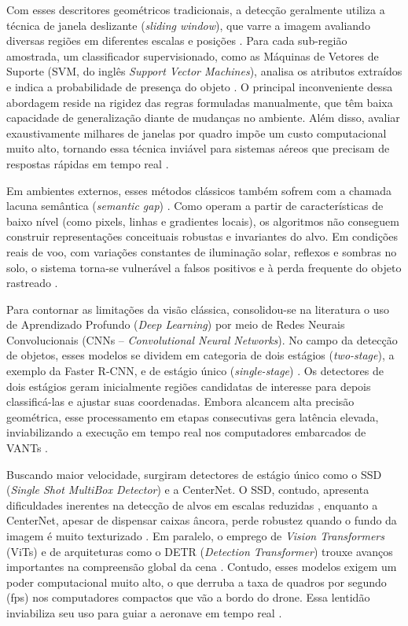 Com esses descritores geométricos tradicionais, a detecção geralmente utiliza a técnica de janela deslizante (\textit{sliding window}), que varre a imagem avaliando diversas regiões em diferentes escalas e posições \cite{amjoud2023, zhao2019}. Para cada sub-região amostrada, um classificador supervisionado, como as Máquinas de Vetores de Suporte (SVM, do inglês \textit{Support Vector Machines}), analisa os atributos extraídos e indica a probabilidade de presença do objeto \cite{amjoud2023, zhao2019}. O principal inconveniente dessa abordagem reside na rigidez das regras formuladas manualmente, que têm baixa capacidade de generalização diante de mudanças no ambiente. Além disso, avaliar exaustivamente milhares de janelas por quadro impõe um custo computacional muito alto, tornando essa técnica inviável para sistemas aéreos que precisam de respostas rápidas em tempo real \cite{zhao2019}.

Em ambientes externos, esses métodos clássicos também sofrem com a chamada lacuna semântica (\textit{semantic gap}) \cite{zhao2019}. Como operam a partir de características de baixo nível (como pixels, linhas e gradientes locais), os algoritmos não conseguem construir representações conceituais robustas e invariantes do alvo. Em condições reais de voo, com variações constantes de iluminação solar, reflexos e sombras no solo, o sistema torna-se vulnerável a falsos positivos e à perda frequente do objeto rastreado \cite{zhao2019}.

Para contornar as limitações da visão clássica, consolidou-se na literatura o uso de Aprendizado Profundo (\textit{Deep Learning}) por meio de Redes Neurais Convolucionais (CNNs -- \textit{Convolutional Neural Networks}). No campo da detecção de objetos, esses modelos se dividem em categoria de dois estágios (\textit{two-stage}), a exemplo da Faster R-CNN, e de estágio único (\textit{single-stage}) \cite{zhao2019, amjoud2023, terven2023}. Os detectores de dois estágios geram inicialmente regiões candidatas de interesse para depois classificá-las e ajustar suas coordenadas. Embora alcancem alta precisão geométrica, esse processamento em etapas consecutivas gera latência elevada, inviabilizando a execução em tempo real nos computadores embarcados de VANTs \cite{amjoud2023}.

Buscando maior velocidade, surgiram detectores de estágio único como o SSD (\textit{Single Shot MultiBox Detector}) e a CenterNet. O SSD, contudo, apresenta dificuldades inerentes na detecção de alvos em escalas reduzidas \cite{amjoud2023}, enquanto a CenterNet, apesar de dispensar caixas âncora, perde robustez quando o fundo da imagem é muito texturizado \cite{xiuling2024}. Em paralelo, o emprego de \textit{Vision Transformers} (ViTs) e de arquiteturas como o DETR (\textit{Detection Transformer}) trouxe avanços importantes na compreensão global da cena \cite{amjoud2023}. Contudo, esses modelos exigem um poder computacional muito alto, o que derruba a taxa de quadros por segundo (fps) nos computadores compactos que vão a bordo do drone. Essa lentidão inviabiliza seu uso para guiar a aeronave em tempo real \cite{rawat2026}.

